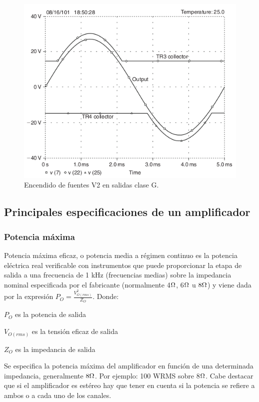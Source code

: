 \begin{figure}[H]
 \centering
 \includegraphics[scale=0.55]{img/ampliG_salida.png}
 \caption{Encendido de fuentes V2 en salidas clase G.}
 \label{ampliG_salida} 
 \end{figure}

\subsection{Principales especificaciones de un amplificador}
\medskip 
\subsubsection{Potencia máxima}

Potencia máxima eficaz, o potencia media a régimen continuo es la potencia eléctrica real verificable con instrumentos que puede proporcionar la etapa de salida  a una frecuencia de 1 kHz (frecuencias medias) sobre la impedancia nominal especificada por el fabricante (normalmente 4$\ohm$, 6$\ohm$ u $8\ohm$) y viene dada por la expresión $P_O=  \frac{V_{O(rms)}^2}{Z_O}$. Donde:
\begin{description}
\item $P_O$ es la potencia de salida
\item $V_{O(rms)}$ es la tensión eficaz de salida
\item $Z_O$ es la impedancia de salida
\end{description}

Se especifica la potencia máxima del amplificador en función de una determinada impedancia, generalmente $8\ohm$. Por ejemplo: 100 WRMS sobre 8$\ohm$.
Cabe destacar que si el amplificador es estéreo hay que tener en cuenta si la potencia se refiere a      ambos o a cada uno de los canales.
\medskip 
